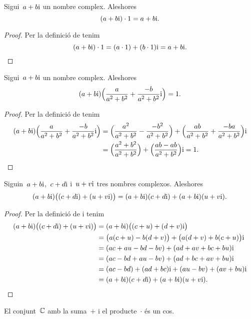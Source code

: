 \documentclass[../../main.tex]{subfiles}
\begin{document}
    \begin{proposition}
        \label{prop:element-neutre-pel-producte-dels-complexos}
        Sigui~\(a+b\mathrm{i}\) un nombre complex.
        Aleshores
        \[
            (a+b\mathrm{i})\cdot1 = a+b\mathrm{i}.
        \]
    \end{proposition}
    \begin{proof}
        Per la definició de  tenim
        \[
            (a+b\mathrm{i})\cdot1 = (a\cdot1)+(b\cdot1)\mathrm{i} = a+b\mathrm{i}.\qedhere
        \]
    \end{proof}
    \begin{proposition}
        \label{prop:element-invers-pel-producte-de-nombres-complexos}
        Sigui~\(a+b\mathrm{i}\) un nombre complex.
        Aleshores
        \[
            (a+b\mathrm{i})\Big(\frac{a}{a^{2}+b^{2}} + \frac{-b}{a^{2}+b^{2}}\mathrm{i}\Big)
            = 1.
        \]
    \end{proposition}
    \begin{proof}
        Per la definició de  tenim
        \begin{align*}
            (a+b\mathrm{i})\Big(\frac{a}{a^{2}+b^{2}}+\frac{-b}{a^{2}+b^{2}}\mathrm{i}\Big)
                &= \Big(\frac{a^{2}}{a^{2}+b^{2}}-\frac{-b^{2}}{a^{2}+b^{2}}\Big)
                   +\Big(\frac{ab}{a^{2}+b^{2}}+\frac{-ba}{a^{2}+b^{2}}\Big)\mathrm{i} \\
                &= \Big(\frac{a^{2}+b^{2}}{a^{2}+b^{2}}\Big)
                   +\Big(\frac{ab-ab}{a^{2}+b^{2}}\Big)\mathrm{i} = 1.\qedhere
        \end{align*}
    \end{proof}
    \begin{proposition}
        \label{prop:distribuitva-del-producte-respecte-la-suma-de-nombres-complexos}
        Siguin~\(a+b\mathrm{i}\),~\(c+d\mathrm{i}\) i~\(u+v\mathrm{i}\) tres nombres complexos.
        Aleshores
        \[
            (a+b\mathrm{i})\big((c+d\mathrm{i})+(u+v\mathrm{i})\big) = (a+b\mathrm{i})(c+d\mathrm{i})+(a+b\mathrm{i})(u+v\mathrm{i}).
        \]
    \end{proposition}
    \begin{proof}
        Per la definició de 
        i  tenim
        \begin{align*}
            (a+b\mathrm{i})\big((c+d\mathrm{i})+(u+v\mathrm{i})\big)
                &= (a+b\mathrm{i})\big((c+u)+(d+v)\mathrm{i}\big) \\
                &= \big(a(c+u)-b(d+v)\big)+\big(a(d+v)+b(c+u)\big)\mathrm{i} \\
                &= (ac+au-bd-bv)+(ad+av+bc+bu)\mathrm{i} \\
                &= (ac-bd+au-bv)+(ad+bc+av+bu)\mathrm{i}\\
                &= (ac-bd)+(ad+bc)\mathrm{i}+(au-bv)+(av+bu)\mathrm{i} \\
                &= (a+b\mathrm{i})(c+d\mathrm{i})+(a+b\mathrm{i})(u+v\mathrm{i}).\qedhere
        \end{align*}
    \end{proof}
    \begin{corollary}
        \label{cor:els-complexos-formen-un-cos}
        El conjunt~\(\mathbb{C}\) amb la suma~\(+\)
        i el producte~\(\cdot\) és un cos.
    \end{corollary}
\end{document}

